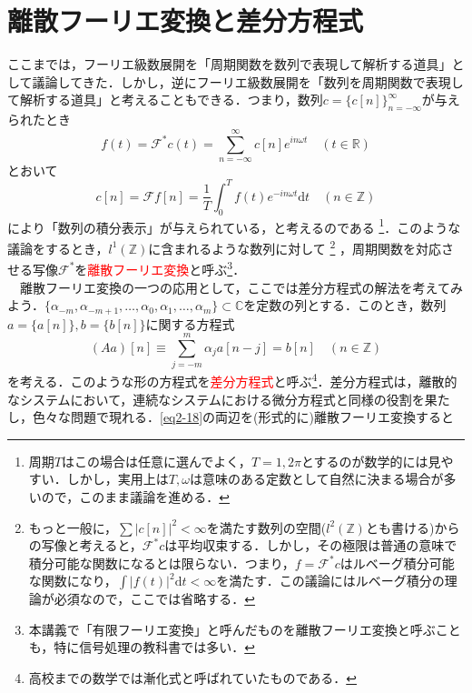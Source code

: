 \documentclass[a4j]{jsbook}
\numberwithin{theorem}{chapter}  %
\begin{document}
\section{離散フーリエ変換と差分方程式} \label{sec2-6}
ここまでは，フーリエ級数展開を「周期関数を数列で表現して解析する道具」として議論してきた．しかし，逆にフーリエ級数展開を「数列を周期関数で表現して解析する道具」と考えることもできる．つまり，数列\(c=\{c[n]\}_{n=-\infty}^\infty\)が与えられたとき
\begin{equation*}
    f(t)=\mathcal{F}^* c(t)=\sum_{n=-\infty}^\infty c[n]e^{in\omega t}\quad (t\in\mathbb{R})
\end{equation*}
とおいて
\begin{equation*}
    c[n]=\mathcal{F}f[n]=\frac{1}{T}\int_0^T f(t)e^{-in\omega t}\mathrm{d}t\quad (n\in\mathbb{Z})
\end{equation*}
により「数列の積分表示」が与えられている，と考えるのである
\footnote{周期\(T\)はこの場合は任意に選んでよく，\(T=1, 2\pi\)とするのが数学的には見やすい．しかし，実用上は\(T, \omega\)は意味のある定数として自然に決まる場合が多いので，このまま議論を進める．
}．このような議論をするとき，\(l^1(\mathbb{Z})\)に含まれるような数列に対して
\footnote{もっと一般に，\(\displaystyle\sum |c[n]|^2<\infty\)を満たす数列の空間(\(l^2(\mathbb{Z})\)とも書ける)からの写像と考えると，\(\mathcal{F}^* c\)は平均収束する．しかし，その極限は普通の意味で積分可能な関数になるとは限らない．つまり，\(f=\mathcal{F}^* c\)はルベーグ積分可能な関数になり，\(\displaystyle\int|f(t)|^2\mathrm{d}t<\infty\)を満たす．この議論にはルベーグ積分の理論が必須なので，ここでは省略する．
}
，周期関数を対応させる写像\(\mathcal{F}^*\)を\textcolor{red}{離散フーリエ変換}と呼ぶ\footnote{本講義で「有限フーリエ変換」と呼んだものを離散フーリエ変換と呼ぶことも，特に信号処理の教科書では多い．}．\\
　離散フーリエ変換の一つの応用として，ここでは差分方程式の解法を考えてみよう．\(\{\alpha_{-m}, \alpha_{-m+1}, \dots, \alpha_0, \alpha_1, \dots, \alpha_m\}\subset\mathbb{C}\)を定数の列とする．このとき，数列\(a=\{a[n]\}, b=\{b[n]\}\)に関する方程式
\begin{equation}
    (Aa)[n]\equiv\sum_{j=-m}^m \alpha_ja[n-j]=b[n]\quad (n\in\mathbb{Z}) \label{eq2-18}
\end{equation}
を考える．このような形の方程式を\textcolor{red}{差分方程式}と呼ぶ\footnote{高校までの数学では漸化式と呼ばれていたものである．}．差分方程式は，離散的なシステムにおいて，連続なシステムにおける微分方程式と同様の役割を果たし，色々な問題で現れる．\eqref{eq2-18}の両辺を(形式的に)離散フーリエ変換すると
\end{document}
